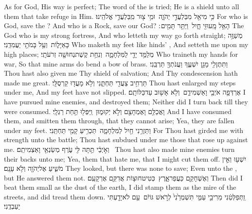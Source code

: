 {As for God, His way is perfect; The word of the \lord\space is tried; He is a shield unto all them that take refuge in Him.}
{כִּ֥י מִי\maqqaf אֵ֖ל מִבַּלְעֲדֵ֣י יְהֹוָ֑ה \setuma  וּמִ֥י צ֖וּר מִֽבַּלְעֲדֵ֥י אֱלֹהֵֽינוּ׃}
{For who is God, save the \lord? And who is a Rock, save our God?}
{הָאֵ֥ל מָֽעוּזִּ֖י חָ֑יִל \setuma  וַיַּתֵּ֥ר תָּמִ֖ים ׃}
{The God who is my strong fortress, And who letteth my way go forth straight;}
{מְשַׁוֶּ֥ה  כָּאַיָּל֑וֹת \setuma  וְעַ֥ל בָּמֹתַ֖י יַעֲמִדֵֽנִי׃}
{Who maketh my feet like hinds’ , And setteth me upon my high places;}
{מְלַמֵּ֥ד יָדַ֖י לַמִּלְחָמָ֑ה \setuma  וְנִחַ֥ת קֶשֶׁת\maqqaf נְחוּשָׁ֖ה זְרֹעֹתָֽי׃}
{Who traineth my hands for war, So that mine arms do bend a bow of brass.}
{וַתִּתֶּן\maqqaf לִ֖י מָגֵ֣ן יִשְׁעֶ֑ךָ וַעֲנֹתְךָ֖ תַּרְבֵּֽנִי׃ \setuma }
{Thou hast also given me Thy shield of salvation; And Thy condescension hath made me great.}
{תַּרְחִ֥יב צַעֲדִ֖י תַּחְתֵּ֑נִי וְלֹ֥א מָעֲד֖וּ קַרְסֻלָּֽי׃}
{Thou hast enlarged my steps under me, And my feet have not slipped.}
{אֶרְדְּפָ֥ה אֹיְבַ֖י וָאַשְׁמִידֵ֑ם \setuma  וְלֹ֥א אָשׁ֖וּב עַד\maqqaf כַּלּוֹתָֽם׃}
{I have pursued mine enemies, and destroyed them; Neither did I turn back till they were consumed.}
{וָאֲכַלֵּ֥ם וָאֶמְחָצֵ֖ם וְלֹ֣א יְקוּמ֑וּן \setuma  וַֽיִּפְּל֖וּ תַּ֥חַת רַגְלָֽי׃}
{And I have consumed them, and smitten them through, that they cannot arise; Yea, they are fallen under my feet.}
{וַתַּזְרֵ֥נִי חַ֖יִל לַמִּלְחָמָ֑ה \setuma  תַּכְרִ֥יעַ קָמַ֖י תַּחְתֵּֽנִי׃}
{For Thou hast girded me with strength unto the battle; Thou hast subdued under me those that rose up against me.}
{וְאֹ֣יְבַ֔י תַּ֥תָּה לִּ֖י עֹ֑רֶף מְשַׂנְאַ֖י וָאַצְמִיתֵֽם׃ \setuma }
{Thou hast also made mine enemies turn their backs unto me; Yea, them that hate me, that I might cut them off.}
{יִשְׁע֖וּ וְאֵ֣ין מֹשִׁ֑יעַ אֶל\maqqaf יְהֹוָ֖ה וְלֹ֥א עָנָֽם׃}
{They looked, but there was none to save; Even unto the \lord, but He answered them not.}
{וְאֶשְׁחָקֵ֖ם כַּעֲפַר\maqqaf אָ֑רֶץ \setuma  כְּטִיט\maqqaf חוּצ֥וֹת אֲדִקֵּ֖ם אֶרְקָעֵֽם׃}
{Then did I beat them small as the dust of the earth, I did stamp them as the mire of the streets, and did tread them down.}
{וַֽתְּפַלְּטֵ֔נִי מֵרִיבֵ֖י עַמִּ֑י תִּשְׁמְרֵ֙נִי֙ לְרֹ֣אשׁ גּוֹיִ֔ם \setuma  עַ֥ם לֹא\maqqaf יָדַ֖עְתִּי יַעַבְדֻֽנִי׃}
